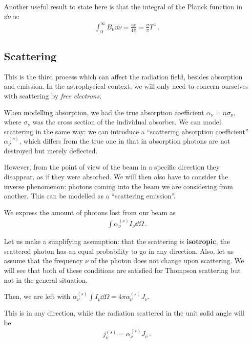 \documentclass[main.tex]{subfiles}
\begin{document}
Another useful result to state here is that the integral of the Planck function in \(\dd{\nu }\) is:
%
\begin{align}
\int_{0}^{\infty } B_\nu \dd{\nu } = \frac{uc}{4 \pi } = \frac{\sigma }{\pi } T^{4}
\,.
\end{align}

\subsection{Scattering}

This is the third process which can affect the radiation field, besides absorption and emission. 
In the astrophysical context, we will only need to concern ourselves with scattering by \emph{free electrons}. 

When modelling absorption, we had the true absorption coefficient \(\alpha_{\nu } = n \sigma_{\nu }\), where \(\sigma_{\nu }\) was the cross section of the individual absorber. 
We can model scattering in the same way: we can introduce a ``scattering absorption coefficient'' \(\alpha_{\nu}^{(s)}\), which differs from the true one in that in absorption photons are not destroyed but merely deflected. 

However, from the point of view of the beam in a specific direction they disappear, as if they were absorbed. 
We will then also have to consider the inverse phenomenon: photons coming into the beam we are considering from another. 
This can be modelled as a ``scattering emission''. 

We express the amount of photons lost from our beam as 
%
\begin{align}
\int \alpha^{(s)}_{\nu } I_\nu \dd{\Omega }
\,.
\end{align}

Let us make a simplifying assumption: that the scattering is \textbf{isotropic}, the scattered photon has an equal probability to go in any direction. Also, let us assume that the frequency \(\nu \) of the photon does not change upon scattering. 
We will see that both of these conditions are satisfied for Thompson scattering but not in the general situation. 

Then, we are left with \(\alpha_{\nu }^{(s)} \int I_\nu \dd{\Omega } = 4 \pi \alpha_{\nu }^{(s)} J_\nu \). 

This is in any direction, while the radiation scattered in the unit solid angle will be 
%
\begin{align}
j_{\nu }^{(s)} = \alpha_{\nu }^{(s)} J_\nu 
\,.
\end{align}
\end{document}
